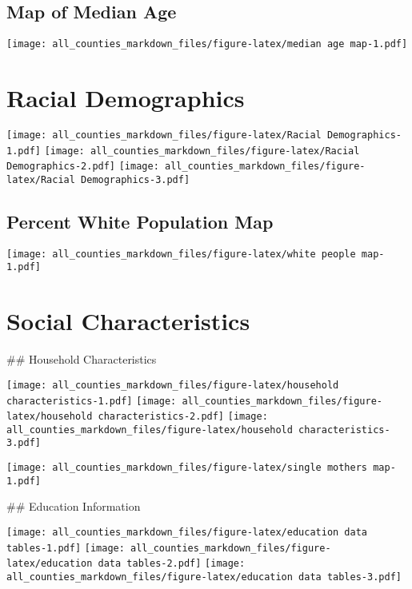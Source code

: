 \documentclass[
]{article}
\begin{document}
\hypertarget{map-of-median-age}{%
\subsection{Map of Median Age}\label{map-of-median-age}}

\texttt{[image: all\_counties\_markdown\_files/figure-latex/median age map-1.pdf]}

\hypertarget{racial-demographics}{%
\section{Racial Demographics}\label{racial-demographics}}

\texttt{[image: all\_counties\_markdown\_files/figure-latex/Racial Demographics-1.pdf]}
\texttt{[image: all\_counties\_markdown\_files/figure-latex/Racial Demographics-2.pdf]}
\texttt{[image: all\_counties\_markdown\_files/figure-latex/Racial Demographics-3.pdf]}

\hypertarget{percent-white-population-map}{%
\subsection{Percent White Population
Map}\label{percent-white-population-map}}

\texttt{[image: all\_counties\_markdown\_files/figure-latex/white people map-1.pdf]}

\hypertarget{social-characteristics}{%
\section{Social Characteristics}\label{social-characteristics}}

\#\# Household Characteristics

\texttt{[image: all\_counties\_markdown\_files/figure-latex/household characteristics-1.pdf]}
\texttt{[image: all\_counties\_markdown\_files/figure-latex/household characteristics-2.pdf]}
\texttt{[image: all\_counties\_markdown\_files/figure-latex/household characteristics-3.pdf]}

\texttt{[image: all\_counties\_markdown\_files/figure-latex/single mothers map-1.pdf]}

\#\# Education Information

\texttt{[image: all\_counties\_markdown\_files/figure-latex/education data tables-1.pdf]}
\texttt{[image: all\_counties\_markdown\_files/figure-latex/education data tables-2.pdf]}
\texttt{[image: all\_counties\_markdown\_files/figure-latex/education data tables-3.pdf]}
\end{document}

